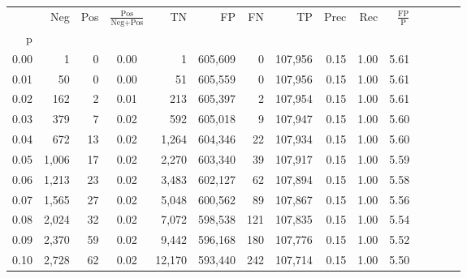 \begin{tabular}{rrrcrrrrrrrrrrr}
\toprule
{} &     Neg &    Pos & $\frac{\text{Pos}}{\text{Neg}+\text{Pos}}$ &       TN &       FP &       FN &       TP &  Prec &   Rec & $\frac{\text{FP}}{\text{P}}$ \\
p    &         &        &                                            &          &          &          &          &       &       &                              \\
\midrule
0.00 &       1 &      0 &                                       0.00 &        1 &  605,609 &        0 &  107,956 &  0.15 &  1.00 &                         5.61 \\
0.01 &      50 &      0 &                                       0.00 &       51 &  605,559 &        0 &  107,956 &  0.15 &  1.00 &                         5.61 \\
0.02 &     162 &      2 &                                       0.01 &      213 &  605,397 &        2 &  107,954 &  0.15 &  1.00 &                         5.61 \\
0.03 &     379 &      7 &                                       0.02 &      592 &  605,018 &        9 &  107,947 &  0.15 &  1.00 &                         5.60 \\
0.04 &     672 &     13 &                                       0.02 &    1,264 &  604,346 &       22 &  107,934 &  0.15 &  1.00 &                         5.60 \\
0.05 &   1,006 &     17 &                                       0.02 &    2,270 &  603,340 &       39 &  107,917 &  0.15 &  1.00 &                         5.59 \\
0.06 &   1,213 &     23 &                                       0.02 &    3,483 &  602,127 &       62 &  107,894 &  0.15 &  1.00 &                         5.58 \\
0.07 &   1,565 &     27 &                                       0.02 &    5,048 &  600,562 &       89 &  107,867 &  0.15 &  1.00 &                         5.56 \\
0.08 &   2,024 &     32 &                                       0.02 &    7,072 &  598,538 &      121 &  107,835 &  0.15 &  1.00 &                         5.54 \\
0.09 &   2,370 &     59 &                                       0.02 &    9,442 &  596,168 &      180 &  107,776 &  0.15 &  1.00 &                         5.52 \\
0.10 &   2,728 &     62 &                                       0.02 &   12,170 &  593,440 &      242 &  107,714 &  0.15 &  1.00 &                         5.50 \\

\end{tabular}
